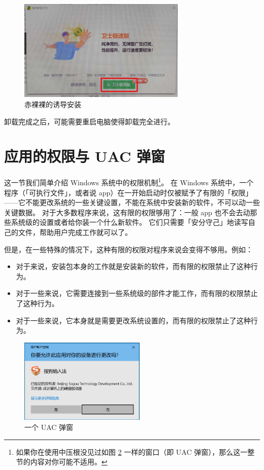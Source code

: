 \begin{figure}[htb!]
  \centering
  \includegraphics[width=8cm]{assets/Confusing_Uninstall.jpg}
  \caption{赤裸裸的诱导安装}
  \label{Confusing_Uninstall}
\end{figure}

卸载完成之后，可能需要重启电脑使得卸载完全进行。

\section{应用的权限与 UAC 弹窗}

这一节我们简单介绍 Windows 系统中的权限机制\footnote{如果你在使用中压根没见过如图 \ref{UAC} 一样的窗口（即 UAC 弹窗），那么这一整节的内容对你可能不适用。}。
在 Windows 系统中，一个程序（「可执行文件」，或者说 app）在一开始启动时仅被赋予了有限的「权限」——它不能更改系统的一些关键设置，不能在系统中安装新的软件，不可以动一些关键数据。
对于大多数程序来说，这有限的权限够用了：一般 app 也不会去动那些系统级的设置或者给你装一个什么新软件。
它们只需要「安分守己」地读写自己的文件，帮助用户完成工作就可以了。

但是，在一些特殊的情况下，这种有限的权限对程序来说会变得不够用。例如：

\begin{itemize}
  \item 对于来说，安装包本身的工作就是安装新的软件，而有限的权限禁止了这种行为。
  \item 对于一些来说，它需要连接到一些系统级的部件才能工作，而有限的权限禁止了这种行为。
  \item 对于一些来说，它本身就是需要更改系统设置的，而有限的权限禁止了这种行为。
\end{itemize}

\begin{figure}
  \centering
  \includegraphics[width=6cm]{assets/UAC.png}
  \caption{一个 UAC 弹窗}
  \label{UAC}
\end{figure}

